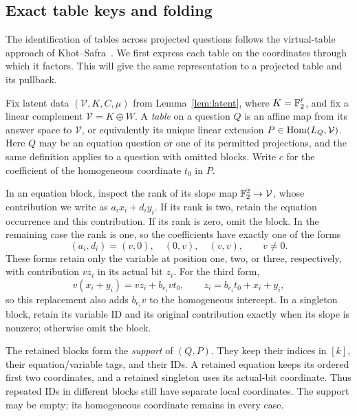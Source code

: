 \subsection{Exact table keys and folding}

The identification of tables across projected questions follows the
virtual-table approach of Khot--Safra~\cite[Section~1.1]{KS13}.
We first express each table on the coordinates through which it factors.
This will give the same representation to a projected table and its
pullback.

Fix latent data \((\mathcal V,K,C,\mu)\) from
Lemma~\ref{lem:latent}, where \(K=\mathbb F_2^\ell\), and fix a linear
complement \(\mathcal V=K\oplus W\).  A \emph{table} on a question
\(Q\) is an affine map from its answer space to \(\mathcal V\), or
equivalently its unique linear extension
\(P\in\operatorname{Hom}(L_Q,\mathcal V)\).  Here \(Q\) may be an equation
question or one of its permitted projections, and the same definition
applies to a question with omitted blocks.  Write \(c\) for the
coefficient of the homogeneous coordinate \(t_0\) in \(P\).

In an equation block, inspect the rank of its slope map
\(\mathbb F_2^2\to\mathcal V\), whose contribution we write as
\(a_i x_i+d_i y_i\).  If its rank is two, retain the equation
occurrence and this contribution.  If its rank is zero, omit the block.
In the remaining case the rank is one, so the coefficients have exactly
one of the forms
\[
 (a_i,d_i)=(v,0),\quad (0,v),\quad (v,v),
 \qquad v\ne0.
\]
These forms retain only the variable at position one, two, or three,
respectively, with contribution \(v z_i\) in its actual bit \(z_i\).
For the third form,
\[
 v(x_i+y_i)=v z_i+b_{e_i}v t_0,
 \qquad z_i=b_{e_i}t_0+x_i+y_i,
\]
so this replacement also adds \(b_{e_i}v\) to the homogeneous
intercept.  In a singleton block, retain its variable ID and its original
contribution exactly when its slope is nonzero; otherwise omit the block.

The retained blocks form the \emph{support} of \((Q,P)\).  They keep
their indices in \([k]\), their equation/variable tags, and their IDs.
A retained equation keeps its ordered first two coordinates, and a retained
singleton uses its actual-bit coordinate.  Thus repeated IDs in different
blocks still have separate local coordinates.  The support may be empty;
its homogeneous coordinate remains in every case.

